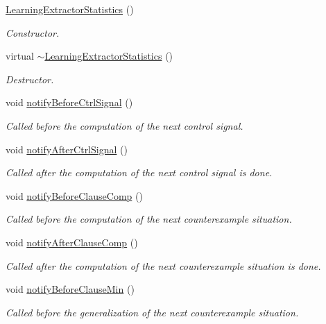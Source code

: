 \begin{DoxyCompactItemize}
\item 
\hyperlink{classLearningExtractorStatistics_a84c53f157498c9fd56b945b084430acc}{Learning\-Extractor\-Statistics} ()
\begin{DoxyCompactList}\small\item\em Constructor. \end{DoxyCompactList}\item 
virtual \hyperlink{classLearningExtractorStatistics_a74d894e52bb6855a2f98877a80024d7c}{$\sim$\-Learning\-Extractor\-Statistics} ()
\begin{DoxyCompactList}\small\item\em Destructor. \end{DoxyCompactList}\item 
void \hyperlink{classLearningExtractorStatistics_a9b82a38db644813eb1d648b026010d6d}{notify\-Before\-Ctrl\-Signal} ()
\begin{DoxyCompactList}\small\item\em Called before the computation of the next control signal. \end{DoxyCompactList}\item 
void \hyperlink{classLearningExtractorStatistics_aad5a2bfb3925bf3645c663a76616ffef}{notify\-After\-Ctrl\-Signal} ()
\begin{DoxyCompactList}\small\item\em Called after the computation of the next control signal is done. \end{DoxyCompactList}\item 
void \hyperlink{classLearningExtractorStatistics_a277b5df115b10544ad922347b777b836}{notify\-Before\-Clause\-Comp} ()
\begin{DoxyCompactList}\small\item\em Called before the computation of the next counterexample situation. \end{DoxyCompactList}\item 
void \hyperlink{classLearningExtractorStatistics_aa353eb06b4a228d4558d181479a146b1}{notify\-After\-Clause\-Comp} ()
\begin{DoxyCompactList}\small\item\em Called after the computation of the next counterexample situation is done. \end{DoxyCompactList}\item 
void \hyperlink{classLearningExtractorStatistics_a93d1b6c361f8e0a4b33e3660691790e4}{notify\-Before\-Clause\-Min} ()
\begin{DoxyCompactList}\small\item\em Called before the generalization of the next counterexample situation. \end{DoxyCompactList}\item 

\end{DoxyCompactItemize}
